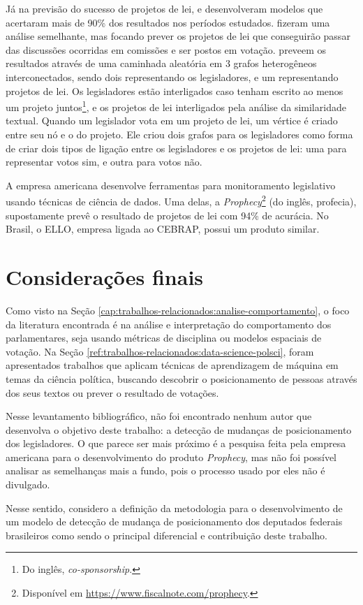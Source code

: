 Já na previsão do sucesso de projetos de lei,  e
 desenvolveram modelos que acertaram mais de 90\% dos
resultados nos períodos estudados.  fizeram uma análise
semelhante, mas focando prever os projetos de lei que conseguirão passar das
discussões ocorridas em comissões e ser postos em votação.
 preveem os resultados através de uma caminhada aleatória
em 3 grafos heterogêneos interconectados, sendo dois representando os
legisladores, e um representando projetos de lei. Os legisladores estão
interligados caso tenham escrito ao menos um projeto juntos\footnote{Do inglês,
\emph{co-sponsorship}.}, e os projetos de lei interligados pela análise da
similaridade textual. Quando um legislador vota em um projeto de lei, um
vértice é criado entre seu nó e o do projeto. Ele criou dois grafos para os
legisladores como forma de criar dois tipos de ligação entre os legisladores e
os projetos de lei: uma para representar votos sim, e outra para votos não.

A empresa americana  desenvolve ferramentas para
monitoramento legislativo usando técnicas de ciência de dados. Uma delas, a
\emph{Prophecy}\footnote{Disponível em
\url{https://www.fiscalnote.com/prophecy}.} (do inglês, profecia), supostamente
prevê o resultado de projetos de lei com 94\% de acurácia. No Brasil, o
\gls{ELLO}, empresa ligada ao \gls{CEBRAP}, possui um produto similar.

\section{Considerações finais}

Como visto na Seção \ref{cap:trabalhos-relacionados:analise-comportamento}, o
foco da literatura encontrada é na análise e interpretação do comportamento dos
parlamentares, seja usando métricas de disciplina ou modelos espaciais de votação.
Na Seção \ref{ref:trabalhos-relacionados:data-science-polsci}, foram
apresentados trabalhos que aplicam técnicas de aprendizagem de máquina em temas
da ciência política, buscando descobrir o posicionamento de pessoas através dos
seus textos ou prever o resultado de votações.

Nesse levantamento bibliográfico, não foi encontrado nenhum autor que
desenvolva o objetivo deste trabalho: a detecção de mudanças de posicionamento
dos legisladores. O que parece ser mais próximo é a pesquisa feita pela empresa
americana  para o desenvolvimento do produto
\emph{Prophecy}, mas não foi possível analisar as semelhanças mais a fundo,
pois o processo usado por eles não é divulgado.

Nesse sentido, considero a definição da metodologia para o desenvolvimento de
um modelo de detecção de mudança de posicionamento dos deputados federais
brasileiros como sendo o principal diferencial e contribuição deste trabalho.
